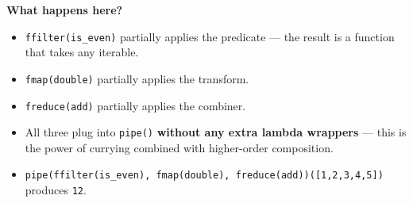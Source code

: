 \documentclass[12pt, a4paper]{article}
\begin{document}
\textbf{What happens here?}
\begin{itemize}
    \item \texttt{ffilter(is\_even)} partially applies the predicate --- the result is a function that takes any iterable.
    \item \texttt{fmap(double)} partially applies the transform.
    \item \texttt{freduce(add)} partially applies the combiner.
    \item All three plug into \texttt{pipe()} \textbf{without any extra lambda wrappers} --- this is the power of currying combined with higher-order composition.
    \item \texttt{pipe(ffilter(is\_even), fmap(double), freduce(add))([1,2,3,4,5])} produces \texttt{12}.
\end{itemize}
\end{document}
